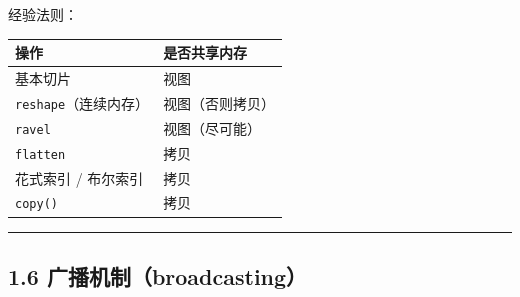 \begin{Shaded}
\begin{Highlighting}[]
\OperatorTok{=}\NormalTok{)}
\OperatorTok{=}\NormalTok{, }\NormalTok{)      }
\NormalTok{b[}\NormalTok{, }\NormalTok{] }\OperatorTok{=} 
\NormalTok{(a[}\NormalTok{])              }

\OperatorTok{=}
\NormalTok{c[}\NormalTok{] }\OperatorTok{=} \OperatorTok{{-}}
\NormalTok{(a[}\NormalTok{])              }

 \NormalTok{)            }
\end{Highlighting}
\end{Shaded}

经验法则：

{\def\LTcaptype{none} %
\begin{longtable}[]{@{}ll@{}}
\toprule\noalign{}
操作 & 是否共享内存 \\
\midrule\noalign{}
\endhead
\bottomrule\noalign{}
\endlastfoot
基本切片 & 视图 \\
\texttt{reshape}（连续内存） & 视图（否则拷贝） \\
\texttt{ravel} & 视图（尽可能） \\
\texttt{flatten} & 拷贝 \\
花式索引 / 布尔索引 & 拷贝 \\
\texttt{copy()} & 拷贝 \\
\end{longtable}
}

\begin{center}\rule{0.5\linewidth}{0.5pt}\end{center}

\subsection{1.6
广播机制（broadcasting）}\label{ux5e7fux64adux673aux5236broadcasting}

